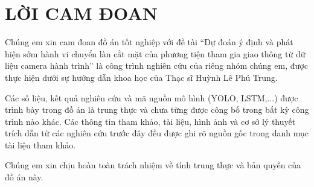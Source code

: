 \section*{LỜI CAM ĐOAN}
	
	Chúng em xin cam đoan đồ án tốt nghiệp với đề tài ``Dự đoán ý định và phát hiện sớm hành vi chuyển làn cắt mặt của phương tiện tham gia giao thông từ dữ liệu camera hành trình'' là công trình nghiên cứu của riêng nhóm chúng em, được thực hiện dưới sự hướng dẫn khoa học của Thạc sĩ Huỳnh Lê Phú Trung.
	
	Các số liệu, kết quả nghiên cứu và mã nguồn mô hình (YOLO, LSTM,...) được trình bày trong đồ án là trung thực và chưa từng được công bố trong bất kỳ công trình nào khác. Các thông tin tham khảo, tài liệu, hình ảnh và cơ sở lý thuyết trích dẫn từ các nghiên cứu trước đây đều được ghi rõ nguồn gốc trong danh mục tài liệu tham khảo.
	
	Chúng em xin chịu hoàn toàn trách nhiệm về tính trung thực và bản quyền của đồ án này.